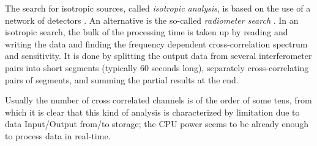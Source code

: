 The search for isotropic sources, called {\em isotropic analysis}, 
is based on the use of a network of detectors \cite{ISOTROPIC1, 
ISOTROPIC2}. An alternative is the so-called {\em radiometer
search} \cite{RADIOMETER}. 
In an isotropic search, the bulk of the processing time is taken up 
by reading and writing the data and finding the frequency dependent 
cross-correlation spectrum and sensitivity. It is done by splitting 
the output data from several interferometer pairs into 
short segments (typically 60 seconds long), separately
cross-correlating  pairs of segments, and summing the partial 
results at the end.  

%
%
Usually the number of cross correlated channels is of the 
order of some tens, from which it is clear that this kind of 
analysis is characterized by limitation due to 
data Input/Output from/to storage; the CPU power 
seems to be already enough to process data in real-time.


